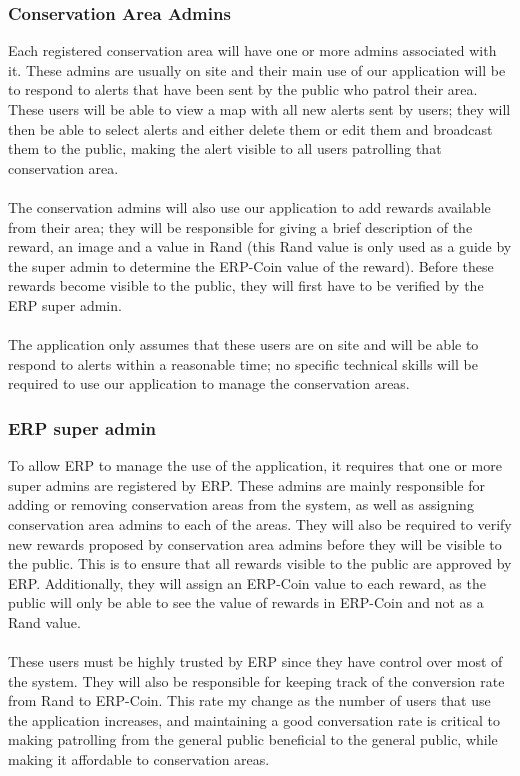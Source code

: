 \documentclass{article}
\begin{document}
\subsubsection*{Conservation Area Admins}
Each registered conservation area will have one or more admins associated with it. These admins are usually on site and their main use of our application will be to respond to alerts that have been sent by the public who patrol their area. These users will be able to view a map with all new alerts sent by users; they will then be able to select alerts and either delete them or edit them and broadcast them to the public, making the alert visible to all users patrolling that conservation area.\\\\The conservation admins will also use our application to add rewards available from their area; they will be responsible for giving a brief description of the reward, an image and a value in Rand (this Rand value is only used as a guide by the super admin to determine the ERP-Coin value of the reward). Before these rewards become visible to the public, they will first have to be verified by the ERP super admin.\\\\The application only assumes that these users are on site and will be able to respond to alerts within a reasonable time; no specific technical skills will be required to use our application to manage the conservation areas.\\

\subsubsection*{ERP super admin}

To allow ERP to manage the use of the application, it requires that one or more super admins are registered by ERP. These admins are mainly responsible for adding or removing conservation areas from the system, as well as assigning conservation area admins to each of the areas. They will also be required to verify new rewards proposed by conservation area admins before they will be visible to the public. This is to ensure that all rewards visible to the public are approved by ERP. Additionally, they will assign an ERP-Coin value to each reward, as the public will only be able to see the value of rewards in ERP-Coin and not as a Rand value.\\\\These users must be highly trusted by ERP since they have control over most of the system. They will also be responsible for keeping track of the conversion rate from Rand to ERP-Coin. This rate my change as the number of users that use the application increases, and maintaining a good conversation rate is critical to making patrolling from the general public beneficial to the general public, while making it affordable to conservation areas. 
\end{document}
